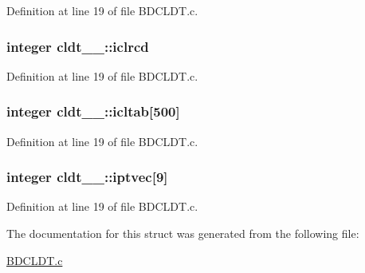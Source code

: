 Definition at line 19 of file B\+D\+C\+L\+D\+T.\+c.

\subsubsection[{\texorpdfstring{iclrcd}{iclrcd}}]{\setlength{\rightskip}{0pt plus 5cm}integer cldt\+\_\+\_\+\+::iclrcd}\hypertarget{structcldt__1___a8fa4f1bcde37d4a835394ec4df07414f}{}\label{structcldt__1___a8fa4f1bcde37d4a835394ec4df07414f}


Definition at line 19 of file B\+D\+C\+L\+D\+T.\+c.

\subsubsection[{\texorpdfstring{icltab}{icltab}}]{\setlength{\rightskip}{0pt plus 5cm}integer cldt\+\_\+\_\+\+::icltab\mbox{[}500\mbox{]}}\hypertarget{structcldt__1___a1ae46bd299befeb5f881ab8079d6ba0c}{}\label{structcldt__1___a1ae46bd299befeb5f881ab8079d6ba0c}


Definition at line 19 of file B\+D\+C\+L\+D\+T.\+c.

\subsubsection[{\texorpdfstring{iptvec}{iptvec}}]{\setlength{\rightskip}{0pt plus 5cm}integer cldt\+\_\+\_\+\+::iptvec\mbox{[}9\mbox{]}}\hypertarget{structcldt__1___a4eac722ad6d6f20a1ae40c9fa5d06175}{}\label{structcldt__1___a4eac722ad6d6f20a1ae40c9fa5d06175}


Definition at line 19 of file B\+D\+C\+L\+D\+T.\+c.



The documentation for this struct was generated from the following file\+:\begin{DoxyCompactItemize}
\item 
\hyperlink{BDCLDT_8c}{B\+D\+C\+L\+D\+T.\+c}\end{DoxyCompactItemize}

